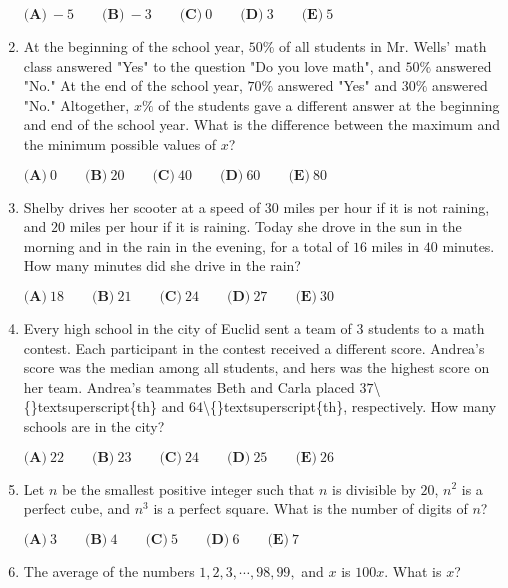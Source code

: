 \documentclass{article}
\begin{document}
\begin{enumerate}[label=\arabic*., itemsep=0.5em]
\(\textbf{(A)}\ -5 \qquad \textbf{(B)}\ -3 \qquad \textbf{(C)}\ 0 \qquad \textbf{(D)}\ 3 \qquad \textbf{(E)}\ 5\)\par \vspace{0.5em}\item At the beginning of the school year, \(50\%\) of all students in Mr. Wells' math class answered "Yes" to the question "Do you love math", and \(50\%\) answered "No." At the end of the school year, \(70\%\) answered "Yes" and \(30\%\) answered "No." Altogether, \(x\%\) of the students gave a different answer at the beginning and end of the school year. What is the difference between the maximum and the minimum possible values of \(x\)?

\(\textbf{(A)}\ 0 \qquad \textbf{(B)}\ 20 \qquad \textbf{(C)}\ 40 \qquad \textbf{(D)}\ 60 \qquad \textbf{(E)}\ 80\)\par \vspace{0.5em}\item Shelby drives her scooter at a speed of \(30\) miles per hour if it is not raining, and \(20\) miles per hour if it is raining. Today she drove in the sun in the morning and in the rain in the evening, for a total of \(16\) miles in \(40\) minutes. How many minutes did she drive in the rain?

\(\textbf{(A)}\ 18 \qquad \textbf{(B)}\ 21 \qquad \textbf{(C)}\ 24 \qquad \textbf{(D)}\ 27 \qquad \textbf{(E)}\ 30\)\par \vspace{0.5em}\item Every high school in the city of Euclid sent a team of \(3\) students to a math contest. Each participant in the contest received a different score. Andrea's score was the median among all students, and hers was the highest score on her team. Andrea's teammates Beth and Carla placed \(37\)\textbackslash\{\}textsuperscript\{th\} and \(64\)\textbackslash\{\}textsuperscript\{th\}, respectively. How many schools are in the city?

\(\textbf{(A)}\ 22 \qquad \textbf{(B)}\ 23 \qquad \textbf{(C)}\ 24 \qquad \textbf{(D)}\ 25 \qquad \textbf{(E)}\ 26\)\par \vspace{0.5em}\item Let \(n\) be the smallest positive integer such that \(n\) is divisible by \(20\), \(n^2\) is a perfect cube, and \(n^3\) is a perfect square. What is the number of digits of \(n\)?

\(\textbf{(A)}\ 3 \qquad \textbf{(B)}\ 4 \qquad \textbf{(C)}\ 5 \qquad \textbf{(D)}\ 6 \qquad \textbf{(E)}\ 7\)\par \vspace{0.5em}\item The average of the numbers \(1, 2, 3,\cdots, 98, 99,\) and \(x\) is \(100x\). What is \(x\)?


\end{enumerate}
\end{document}
